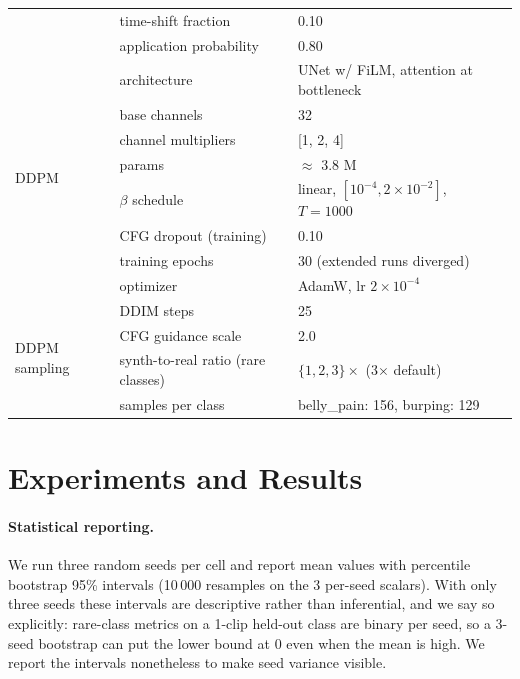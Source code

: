 \documentclass[10pt]{article}
\begin{document}
\begin{table}[!ht]
\begin{tabular}{lll}
                             & time-shift fraction & 0.10 \\
                             & application probability & 0.80 \\
\midrule
\multirow{8}{*}{DDPM} & architecture & UNet w/ FiLM, attention at bottleneck \\
                      & base channels & 32 \\
                      & channel multipliers & [1, 2, 4] \\
                      & params & $\approx$ 3.8 M \\
                      & $\beta$ schedule & linear, $[10^{-4}, 2\times10^{-2}]$, $T=1000$ \\
                      & CFG dropout (training) & 0.10 \\
                      & training epochs & 30 (extended runs diverged) \\
                      & optimizer & AdamW, lr $2\times10^{-4}$ \\
\midrule
\multirow{4}{*}{DDPM sampling} & DDIM steps & 25 \\
                               & CFG guidance scale & 2.0 \\
                               & synth-to-real ratio (rare classes) & $\{1,2,3\}\times$ (3$\times$ default) \\
                               & samples per class & belly\_pain: 156, burping: 129 \\
\bottomrule
\end{tabular}
\end{table}

\section{Experiments and Results}\label{sec:expts}

\paragraph{Statistical reporting.} We run three random seeds per cell and report mean values with percentile bootstrap 95\% intervals \citep{efron1986bootstrap} (10\,000 resamples on the 3 per-seed scalars). With only three seeds these intervals are descriptive rather than inferential, and we say so explicitly: rare-class metrics on a 1-clip held-out class are binary per seed, so a 3-seed bootstrap can put the lower bound at 0 even when the mean is high. We report the intervals nonetheless to make seed variance visible.
\end{document}
